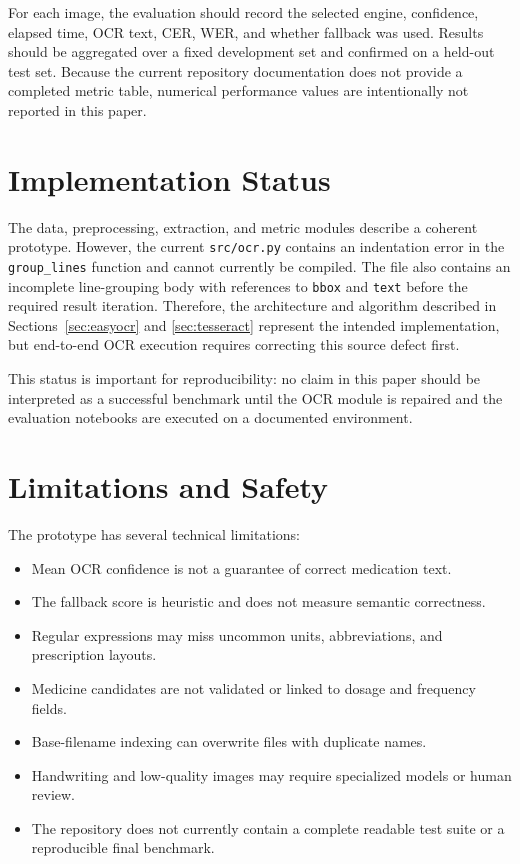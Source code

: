 \documentclass[conference]{IEEEtran}
\begin{document}
For each image, the evaluation should record the selected engine, confidence,
elapsed time, OCR text, CER, WER, and whether fallback was used. Results should
be aggregated over a fixed development set and confirmed on a held-out test
set. Because the current repository documentation does not provide a completed
metric table, numerical performance values are intentionally not reported in
this paper.

\section{Implementation Status}
\label{sec:status}

The data, preprocessing, extraction, and metric modules describe a coherent
prototype. However, the current \texttt{src/ocr.py} contains an indentation
error in the \texttt{group\_lines} function and cannot currently be compiled.
The file also contains an incomplete line-grouping body with references to
\texttt{bbox} and \texttt{text} before the required result iteration. Therefore,
the architecture and algorithm described in Sections~\ref{sec:easyocr} and
\ref{sec:tesseract} represent the intended implementation, but end-to-end OCR
execution requires correcting this source defect first.

\noindent This status is important for reproducibility: no claim in this paper should be
interpreted as a successful benchmark until the OCR module is repaired and the
evaluation notebooks are executed on a documented environment.

\section{Limitations and Safety}
\label{sec:limitations}

The prototype has several technical limitations:

\begin{itemize}
    \item Mean OCR confidence is not a guarantee of correct medication text.
    \item The fallback score is heuristic and does not measure semantic
    correctness.
    \item Regular expressions may miss uncommon units, abbreviations, and
    prescription layouts.
    \item Medicine candidates are not validated or linked to dosage and
    frequency fields.
    \item Base-filename indexing can overwrite files with duplicate names.
    \item Handwriting and low-quality images may require specialized models or
    human review.
    \item The repository does not currently contain a complete readable test
    suite or a reproducible final benchmark.
\end{itemize}
\end{document}
